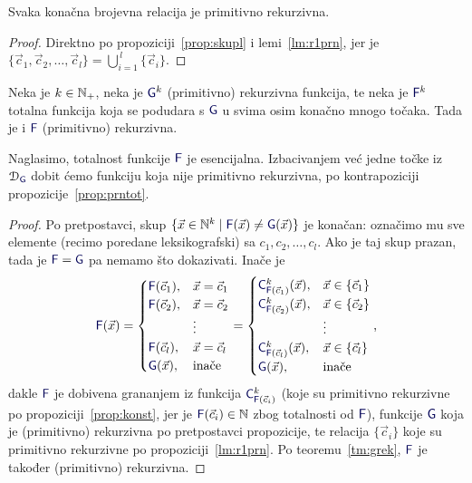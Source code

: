 \begin{korolar}\label{kor:konprn}
Svaka konačna brojevna relacija je primitivno rekurzivna.
\end{korolar}
\begin{proof}
Direktno po propoziciji~\ref{prop:skupl} i lemi~\ref{lm:r1prn}, jer je $\{\vec c_1,\vec c_2,\dotsc,\vec c_l\}=\bigcup_{i=1}^{\,l}\{\vec c_i\}$.
\end{proof}

\begin{propozicija}\label{prop:konprom}
Neka je $k\in{\mathbb N}_+$, neka je $\f G^k$ (primitivno) rekurzivna funkcija, te neka je $\f F^k$ totalna funkcija koja se podudara s $\f G$ u svima osim konačno mnogo točaka. Tada je i $\f F$ (primitivno) rekurzivna.
\end{propozicija}
Naglasimo, totalnost funkcije $\f F$ je esencijalna. Izbacivanjem već jedne točke iz $\dom{\f G}$ dobit ćemo funkciju koja nije primitivno rekurzivna, po kontrapoziciji propozicije~\ref{prop:prntot}.
\begin{proof}
Po pretpostavci, skup $\{\vec x\in\N^k\mid\f F(\vec x)\not=\f G(\vec x)\}$ je konačan: označimo mu sve elemente (recimo poredane leksikografski) sa $c_1,c_2,\dotsc,c_l$. Ako je taj skup prazan, tada je $\f F=\f G$ pa nemamo što dokazivati. Inače je
\begin{equation}
    \f F(\vec x)=\begin{cases}
    \f F(\vec c_1),&\vec x=\vec c_1\\
    \f F(\vec c_2),&\vec x=\vec c_2\\
    &\vdots\\
    \f F(\vec c_l),&\vec x=\vec c_l\\
    \f G(\vec x),&\text{inače}
    \end{cases}=\begin{cases}
    \f C^k_{\f F(\vec c_1)}(\vec x),&\vec x\in\{\vec c_1\}\\
    \f C^k_{\f F(\vec c_2)}(\vec x),&\vec x\in\{\vec c_2\}\\
    &\vdots\\
    \f C^k_{\f F(\vec c_l)}(\vec x),&\vec x\in\{\vec c_l\}\\
    \f G(\vec x),&\text{inače}
    \end{cases}\text,
\end{equation}
dakle $\f F$ je dobivena grananjem iz funkcija $\f C^k_{\f F(\vec c_i)}$ (koje su primitivno rekurzivne po propoziciji~\ref{prop:konst}, jer je $\f F(\vec c_i)\in\N$ zbog totalnosti od $\f F$), funkcije $\f G$ koja je (primitivno) rekurzivna po pretpostavci propozicije, te relacija $\{\vec c_i\}$ koje su primitivno rekurzivne po propoziciji~\ref{lm:r1prn}. Po teoremu~\ref{tm:grek}, $\f F$ je također (primitivno) rekurzivna.
\end{proof}


